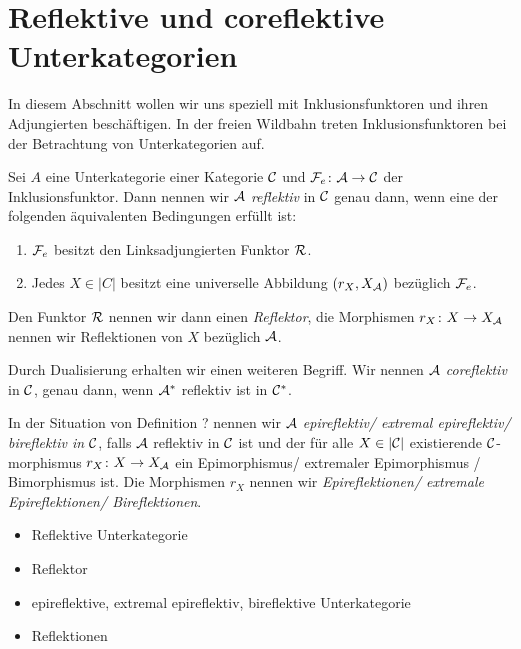 \section{Reflektive und coreflektive Unterkategorien}

In diesem Abschnitt wollen wir uns speziell mit Inklusionsfunktoren und ihren Adjungierten beschäftigen. 
In der freien Wildbahn treten Inklusionsfunktoren bei der Betrachtung von Unterkategorien auf.

\begin{defn}
  Sei $A$ eine Unterkategorie einer Kategorie $\mathcal{C}$ und $\mathcal{F}_e \colon \mathcal{A} \to \mathcal{C}$ der Inklusionsfunktor.
  Dann nennen wir $\mathcal{A}$ \emph{reflektiv} in $\mathcal{C}$ genau dann, wenn eine der folgenden äquivalenten Bedingungen erfüllt ist:
  \begin{enumerate}[(1)]
    \item $\mathcal{F}_e$ besitzt den Linksadjungierten Funktor $\mathcal{R}$.
    \item Jedes $X \in |C|$ besitzt eine universelle Abbildung $(r_X, X_{\mathcal{A}})$ bezüglich $\mathcal{F}_e$.
  \end{enumerate}
  Den Funktor $\mathcal{R}$ nennen wir dann einen \emph{Reflektor}, die Morphismen $r_X \colon X \to X_{\mathcal{A}}$ nennen wir Reflektionen von $X$ bezüglich $\mathcal{A}$.

  Durch Dualisierung erhalten wir einen weiteren Begriff.
  Wir nennen $\mathcal{A}$ \emph{coreflektiv} in $\mathcal{C}$, genau dann, wenn $\mathcal{A}^*$ reflektiv ist in $\mathcal{C}^*$. 
\end{defn}

\begin{defn}
  In der Situation von Definition ? nennen wir $\mathcal{A}$ \emph{epireflektiv/ extremal epireflektiv/ bireflektiv in} $\mathcal{C}$, falls $\mathcal{A}$ reflektiv in $\mathcal{C}$ ist und der für alle $X \in |\mathcal{C}|$ existierende $\mathcal{C}$-morphismus $r_X \colon X \to X_{\mathcal{A}}$ ein Epimorphismus/ extremaler Epimorphismus / Bimorphismus ist.
  Die Morphismen $r_X$ nennen wir \emph{Epireflektionen/ extremale Epireflektionen/ Bireflektionen}.
\end{defn}

  \begin{itemize}
    \item Reflektive Unterkategorie
    \item Reflektor
    \item epireflektive, extremal epireflektiv, bireflektive Unterkategorie
    \item Reflektionen
  \end{itemize}

